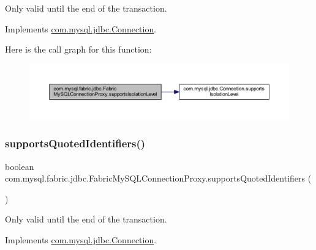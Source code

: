 Only valid until the end of the transaction. 

Implements \mbox{\hyperlink{interfacecom_1_1mysql_1_1jdbc_1_1_connection_aea32f547f2d12d07de7792a6cdb20585}{com.\+mysql.\+jdbc.\+Connection}}.

Here is the call graph for this function\+:\nopagebreak
\begin{figure}[H]
\begin{center}
\leavevmode
\includegraphics[width=350pt]{classcom_1_1mysql_1_1fabric_1_1jdbc_1_1_fabric_my_s_q_l_connection_proxy_a5f9c2ce827dc172a0dead6a76ba1d48a_cgraph}
\end{center}
\end{figure}
\mbox{\label{classcom_1_1mysql_1_1fabric_1_1jdbc_1_1_fabric_my_s_q_l_connection_proxy_aa4c9ae2613fa025d3498bb4eae8fae8e}} 
\subsubsection{\texorpdfstring{supports\+Quoted\+Identifiers()}{supportsQuotedIdentifiers()}}
{\footnotesize\ttfamily boolean com.\+mysql.\+fabric.\+jdbc.\+Fabric\+My\+S\+Q\+L\+Connection\+Proxy.\+supports\+Quoted\+Identifiers (\begin{DoxyParamCaption}{ }\end{DoxyParamCaption})}

Only valid until the end of the transaction. 

Implements \mbox{\hyperlink{interfacecom_1_1mysql_1_1jdbc_1_1_connection_a16e68907781a09083ff1afda25dff502}{com.\+mysql.\+jdbc.\+Connection}}.

